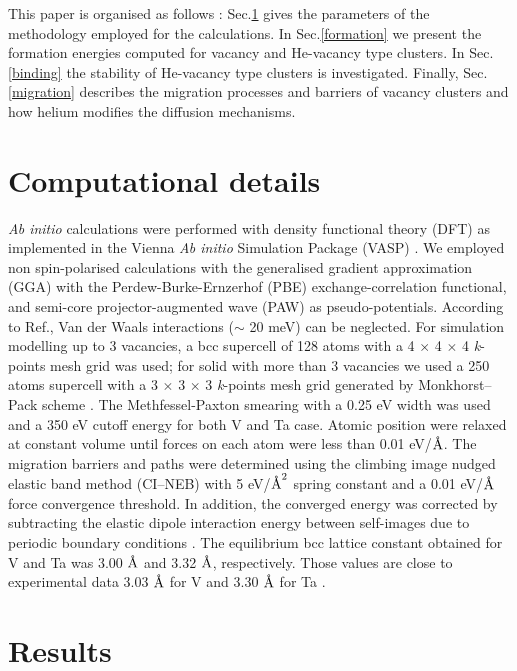 \documentclass[a4,12pt,showpacs,preprintnumbers,amsmath,amssymb]{revtex4}
\newcommand{\angstrom}{\text{\normalfont\AA}}
\begin{document}
This paper is organised as follows : Sec.\ref{compute} gives the parameters of the methodology employed for the calculations.
In Sec.\ref{formation} we present the formation energies computed for vacancy and He-vacancy type clusters.
In Sec.\ref{binding} the stability of He-vacancy type clusters is investigated.
Finally, Sec.\ref{migration} describes the migration processes and barriers of vacancy clusters and 
how helium modifies the diffusion mechanisms.

\section{Computational details}\label{compute}
\textit{Ab initio} calculations were performed with density functional theory (DFT) as implemented in the 
Vienna \textit{Ab initio} Simulation Package (VASP) \cite{kresse1996,kresse1993}. 
We employed non spin-polarised calculations with the generalised gradient approximation (GGA) with 
the Perdew-Burke-Ernzerhof (PBE) \cite{PBE} exchange-correlation functional, 
and semi-core projector-augmented wave (PAW) \cite{Blochl,kresse1999} as pseudo-potentials. 
According to Ref.\cite{Zhang2015}, Van der Waals interactions ($\sim$ 20 meV) can be neglected.
For simulation modelling up to 3 vacancies, a bcc supercell of 128 atoms with a 4 $\times$ 4 $\times$ 4 
\textit{k}-points mesh grid was used; for solid with more than 3 vacancies we used a 250 atoms supercell 
with a 3 $\times$ 3 $\times$ 3 \textit{k}-points mesh grid generated by Monkhorst--Pack scheme \cite{MPack}.
The Methfessel-Paxton smearing \cite{MethPaxton} with a 0.25 eV width was used and a 350 eV cutoff energy 
for both V and Ta case.
Atomic position were relaxed at constant volume until forces on each atom were less than 0.01 eV/$\angstrom$.
The migration barriers and paths were determined using the climbing image nudged elastic band method (CI--NEB) 
\cite{henkelmann2000_2,henkelmann2000_1} with 5 eV/$\angstrom^2$ spring constant and a 0.01 eV/$\angstrom$ 
force convergence threshold.
In addition, the converged energy was corrected by subtracting the elastic dipole interaction energy between
self-images due to periodic boundary conditions \cite{varvenne2013}. 
The equilibrium bcc lattice constant obtained for V and Ta was 3.00 $\angstrom$ and 3.32 $\angstrom$, respectively. 
Those values are close to experimental data 3.03 $\angstrom$ for V and 3.30 $\angstrom$ for Ta \cite{kittel}.


\section{Results}
\end{document}
